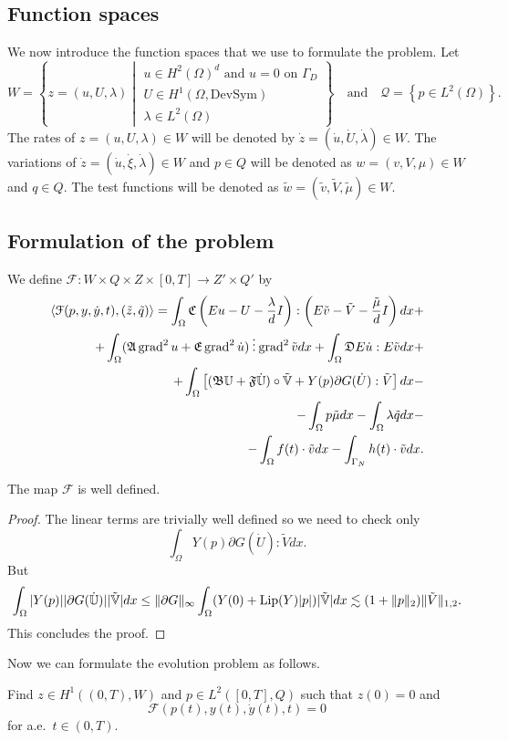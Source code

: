 \subsection{Function spaces}

We now introduce the function spaces that we use to formulate the problem. Let
\[
W=\left\{z=(u,U,\lambda)\middle|\substack{\text{$u\in H^2(\Omega)^d$ and $u=0$ on $\Gamma_D$}\\U\in H^1(\Omega,\text{DevSym})\\\lambda\in L^2(\Omega)}\right\}\quad\text{and}\quad\mathscr{Q}=\left\{p\in L^2(\Omega)\right\}.
\]
The rates of $z=(u,U,\lambda)\in W$ will be denoted by $\dot z=(\dot u,\dot U,\dot\lambda)\in W$. The variations of $\dot z=(\dot u,\dot\xi,\dot\lambda)\in W$ and $p\in Q$ will be denoted as $w=(v,V,\mu)\in W$ and $q\in Q$. The test functions will be denoted as $\tilde w=(\tilde v,\tilde V,\tilde\mu)\in W$.

\subsection{Formulation of the problem}

We define $\mathcal{F}\colon W\times Q\times Z\times[0,T]\to Z'\times Q'$ by
\[
\begin{split}
\langle\mathcal{F}(p,y,\dot y,t),(\tilde z,\tilde q)\rangle=\int_\Omega\mathfrak{C}\left(Eu-U-\frac{\lambda}{d}I\right):\left(E\tilde v-\tilde V-\frac{\tilde\mu}{d}I\right)dx+\\
+\int_\Omega(\mathfrak{A}\operatorname{grad}^2 u+\mathfrak{E}\operatorname{grad}^2\dot u)\mathbin{\vdots}\operatorname{grad}^2\tilde vdx+\int_\Omega\mathfrak{D} E\dot u:E\tilde vdx+\\
+\int_\Omega\left[(\mathfrak{B}\mathbb{U}+\mathfrak{F}\dot{\mathbb{U}})\circ\tilde{\mathbb{V}}+Y(p)\partial G(\dot U):\tilde V\right]dx-\\
-\int_\Omega p\tilde\mu dx-\int_\Omega\lambda\tilde qdx-\\
-\int_\Omega f(t)\cdot\tilde vdx-\int_{\Gamma_N}h(t)\cdot\tilde vdx.
\end{split}
\]
\begin{lemma}
\label{lemma:F-well}
The map $\mathcal{F}$ is well defined.
\end{lemma}
\begin{proof}
The linear terms are trivially well defined so we need to check only
\begin{equation}
\label{eqn:nonlinear-terms-F}
\int_{\Omega}Y(p)\partial G(\dot U):\tilde Vdx.
\end{equation}
But
\[
\int_{\Omega}|Y(p)||\partial G(\dot{\mathbb{U}})||\tilde{\mathbb V}|dx\le\lVert\partial G\rVert_\infty\int_{\Omega}(Y(0)+\text{Lip}(Y)|p|)|\tilde{\mathbb V}|dx\lesssim(1+\lVert p\rVert_2)\lVert\tilde V\rVert_{1,2}.
\]
This concludes the proof.
\end{proof}
Now we can formulate the evolution problem as follows.
\begin{prb}
\label{prb:problem}
Find $z\in H^1((0,T),W)$ and $p\in L^2([0,T],Q)$ such that $z(0)=0$ and
\[
\mathcal{F}(p(t),y(t),\dot y(t),t)=0
\]
for a.e.\ $t\in(0,T)$.
\end{prb}

